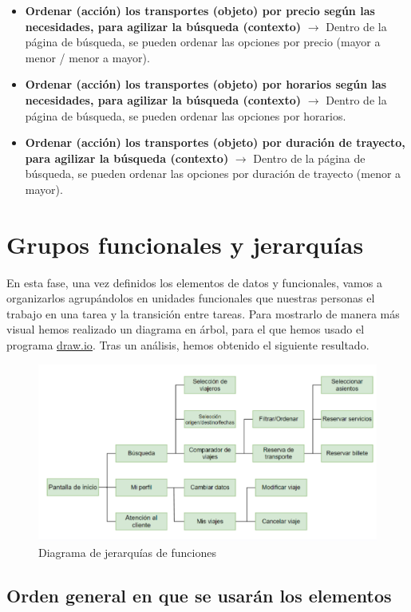 \begin{itemize}
      \item \textbf{Ordenar (acción) los transportes (objeto) por precio según las necesidades, para agilizar la búsqueda (contexto)} $\rightarrow$ Dentro de la página
            de búsqueda, se pueden ordenar las opciones por precio (mayor a menor / menor a mayor).
      \item \textbf{Ordenar (acción) los transportes (objeto) por horarios según las necesidades, para agilizar la búsqueda (contexto)} $\rightarrow$ Dentro de la página
            de búsqueda, se pueden ordenar las opciones por horarios.
      \item \textbf{Ordenar (acción) los transportes (objeto) por duración de trayecto, para agilizar la búsqueda (contexto)} $\rightarrow$ Dentro de la página de
            búsqueda, se pueden ordenar las opciones por duración de trayecto (menor a mayor).
\end{itemize}

\section{Grupos funcionales y jerarquías}

En esta fase, una vez definidos los elementos de datos y funcionales, vamos a
organizarlos agrupándolos en unidades funcionales que nuestras personas el
trabajo en una tarea y la transición entre tareas. Para mostrarlo de manera más
visual hemos realizado un diagrama en árbol, para el que hemos usado el
programa \underline{\href{https://www.drawio.com/}{draw.io}}. Tras un análisis,
hemos obtenido el siguiente resultado.

\begin{figure}[H]
      \centering
      \includegraphics[width=0.8\linewidth]{./Imagenes/jerarquia.png}
      \caption{Diagrama de jerarquías de funciones}
      \label{fig:jerarquias}
\end{figure}

\subsection{Orden general en que se usarán los elementos}

